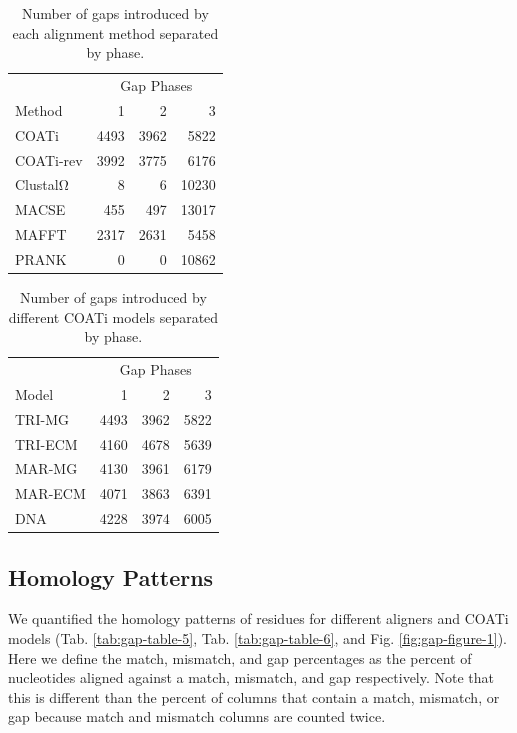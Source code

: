 \documentclass[
]{article}
\begin{document}
\begin{table}[H]

\caption{\label{tab:gap-table-3}Number of gaps introduced by each alignment method separated by phase.}
\centering
\begin{tabular}[t]{lrrr}
\toprule
\multicolumn{1}{c}{ } & \multicolumn{3}{c}{Gap Phases} \\
\cmidrule(l{3pt}r{3pt}){2-4}
Method & 1 & 2 & 3\\
\midrule
COATi & 4493 & 3962 & 5822\\
\addlinespace
COATi-rev & 3992 & 3775 & 6176\\
\addlinespace
ClustalΩ & 8 & 6 & 10230\\
\addlinespace
MACSE & 455 & 497 & 13017\\
\addlinespace
MAFFT & 2317 & 2631 & 5458\\
\addlinespace
PRANK & 0 & 0 & 10862\\
\bottomrule
\end{tabular}
\end{table}

\begin{table}[H]

\caption{\label{tab:gap-table-4}Number of gaps introduced by different COATi models separated by phase.}
\centering
\begin{tabular}[t]{lrrr}
\toprule
\multicolumn{1}{c}{ } & \multicolumn{3}{c}{Gap Phases} \\
\cmidrule(l{3pt}r{3pt}){2-4}
Model & 1 & 2 & 3\\
\midrule
TRI-MG & 4493 & 3962 & 5822\\
\addlinespace
TRI-ECM & 4160 & 4678 & 5639\\
\addlinespace
MAR-MG & 4130 & 3961 & 6179\\
\addlinespace
MAR-ECM & 4071 & 3863 & 6391\\
\addlinespace
DNA & 4228 & 3974 & 6005\\
\bottomrule
\end{tabular}
\end{table}

\hypertarget{homology-patterns}{%
\subsection{Homology Patterns}\label{homology-patterns}}

We quantified the homology patterns of residues for different aligners and COATi models (Tab. \ref{tab:gap-table-5}, Tab. \ref{tab:gap-table-6}, and Fig. \ref{fig:gap-figure-1}). Here we define the match, mismatch, and gap percentages as the percent of nucleotides aligned against a match, mismatch, and gap respectively. Note that this is different than the percent of columns that contain a match, mismatch, or gap because match and mismatch columns are counted twice.
\end{document}
